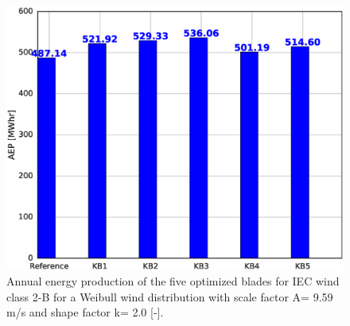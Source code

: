 
%

\begin{figure}[pht]
\begin{center}
	\includegraphics[width=.85\linewidth]{figures/KBcomp_AEPcomp_2B.eps}
\end{center}
\caption{Annual energy production of the five optimized blades for IEC wind class 2-B for a Weibull wind distribution with scale factor A= 9.59 m/s and shape factor k= 2.0 [-].}
\label{fig:KB_AEP}
\end{figure}


